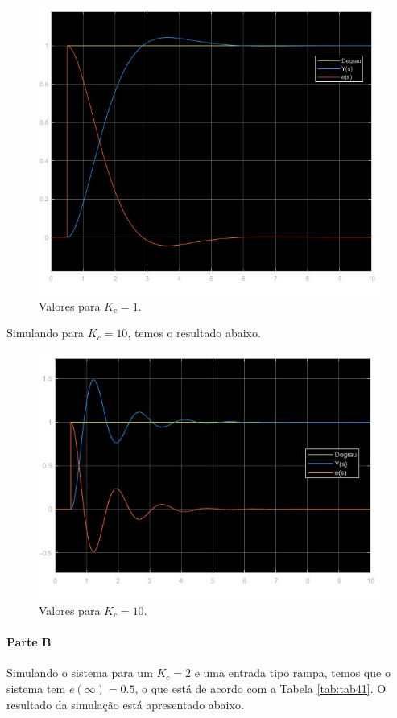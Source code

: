 \documentclass[
]{book}
\theoremstyle{definition}
\theoremstyle{definition}
\theoremstyle{definition}
\theoremstyle{remark}
\begin{document}
\begin{figure}
\includegraphics[width=0.8\linewidth]{Imagens/Lab4/Resolução/prob2A1} \caption{Valores para $K_c = 1$.}\label{fig:fig42A1}
\end{figure}

Simulando para \(K_c = 10\), temos o resultado abaixo.

\begin{figure}
\includegraphics[width=0.8\linewidth]{Imagens/Lab4/Resolução/prob2A2} \caption{Valores para $K_c = 10$.}\label{fig:fig42A2}
\end{figure}

\hypertarget{parte-b-2}{%
\paragraph{Parte B}\label{parte-b-2}}

Simulando o sistema para um \(K_c = 2\) e uma entrada tipo rampa, temos que o sistema tem \(e(\infty) = 0.5\), o que está de acordo com a Tabela \ref{tab:tab41}. O resultado da simulação está apresentado abaixo.
\end{document}
